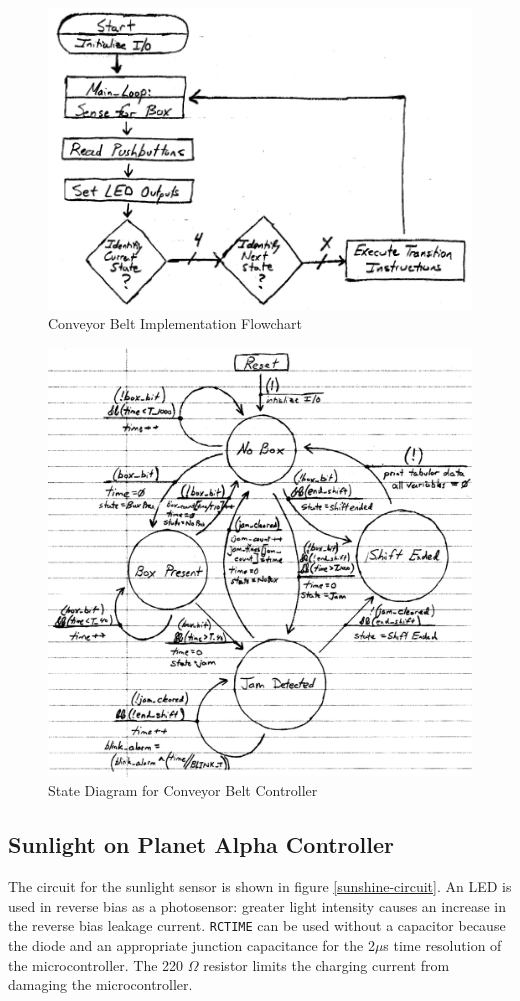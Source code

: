 \documentclass[11pt]{article}
\begin{document}
\begin{figure}[h!]
\centering
\includegraphics[width=.5\textwidth]{conveyor-flowchart.pdf}
\caption{Conveyor Belt Implementation Flowchart}
\label{conveyor-flowchart}
\end{figure}

\begin{figure}[h!]
\centering
\includegraphics[width=.8\textwidth]{conveyor-state-diagram.pdf}
\caption{State Diagram for Conveyor Belt Controller}
\label{conveyor-state-diagram}
\end{figure}

\clearpage
\subsection{Sunlight on Planet Alpha Controller}

The circuit for the sunlight sensor is shown in figure \ref{sunshine-circuit}.
An LED is used in reverse bias as a photosensor: greater light intensity
causes an increase in the reverse bias leakage current.
\texttt{RCTIME} can be used without a capacitor because the diode
and an appropriate junction capacitance for the 2$\mu$s time resolution
of the microcontroller. The 220 $\Omega$ resistor limits the charging current
from damaging the microcontroller.
\end{document}

